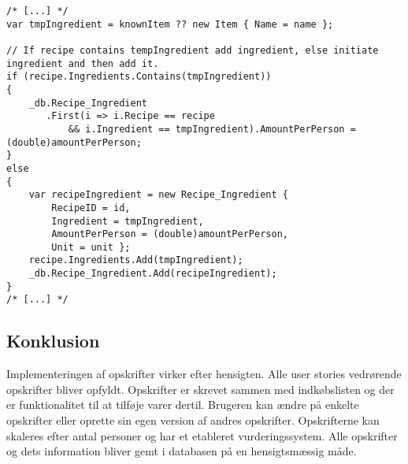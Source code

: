 \begin{lstlisting}[caption="Udklip fra AddIngredient som opretter og tilføjer ingredienser til en specifik opskrift - Her er vist hvad der er forskel fra AddItem i ShoppingListsController"]
/* [...] */          
var tmpIngredient = knownItem ?? new Item { Name = name };

// If recipe contains tempIngredient add ingredient, else initiate ingredient and then add it.
if (recipe.Ingredients.Contains(tmpIngredient))
{
    _db.Recipe_Ingredient
       .First(i => i.Recipe == recipe 
       	   && i.Ingredient == tmpIngredient).AmountPerPerson = (double)amountPerPerson;
}
else
{
    var recipeIngredient = new Recipe_Ingredient { 
    	RecipeID = id, 
    	Ingredient = tmpIngredient, 
    	AmountPerPerson = (double)amountPerPerson, 
    	Unit = unit };
    recipe.Ingredients.Add(tmpIngredient);
    _db.Recipe_Ingredient.Add(recipeIngredient);
}
/* [...] */          
\end{lstlisting}


\subsection{Konklusion}
Implementeringen af opskrifter virker efter hensigten. 
Alle user stories vedrørende opskrifter bliver opfyldt. 
Opskrifter er skrevet sammen med indkøbslisten og der er funktionalitet til at tilføje varer dertil. 
Brugeren kan ændre på enkelte opskrifter eller oprette sin egen version af andres opskrifter. 
Opskrifterne kan skaleres efter antal personer og har et etableret vurderingssystem. 
Alle opskrifter og dets information bliver gemt i databasen på en hensigtsmæssig måde.
